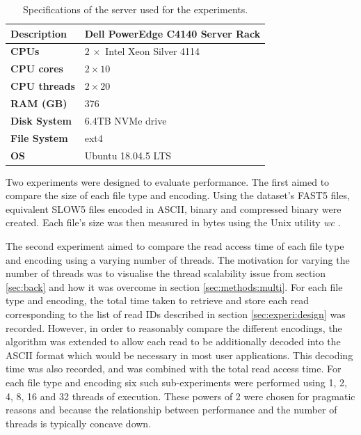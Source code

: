 \begin{table}[h!]
    \caption{Specifications of the server used for the experiments.\label{tab:server}}
    \begin{tabular}{|l|l|}
        \hline
        \textbf{Description} & Dell PowerEdge C4140 Server Rack \\
        \hline
        \textbf{CPUs} & $2\, \times$ Intel Xeon Silver 4114 \\
        \textbf{CPU cores} & $2 \times 10$ \\
        \textbf{CPU threads} & $2 \times 20$ \\
        \hline
        \textbf{RAM\nomenclature{RAM}{Random-access memory} (GB)} & 376 \\
        \textbf{Disk System} & 6.4TB NVMe drive \\
        \textbf{File System} & ext4 \\
        \textbf{OS\nomenclature{OS}{Operating system}} & Ubuntu 18.04.5 LTS\\
        \hline
    \end{tabular}
\end{table}

Two experiments were designed to evaluate performance. The first aimed to compare the size of each file type and encoding. Using the dataset's FAST5 files, equivalent SLOW5 files encoded in ASCII, binary and compressed binary were created. Each file's size was then measured in bytes using the Unix utility \textit{wc} \cite{wc}.

The second experiment aimed to compare the read access time of each file type and encoding using a varying number of threads. The motivation for varying the number of threads was to visualise the thread scalability issue from section \ref{sec:back} and how it was overcome in section \ref{sec:methods:multi}. For each file type and encoding, the total time taken to retrieve and store each read corresponding to the list of read IDs described in section \ref{sec:experi:design} was recorded. However, in order to reasonably compare the different encodings, the algorithm was extended to allow each read to be additionally decoded into the ASCII format which would be necessary in most user applications. This decoding time was also recorded, and was combined with the total read access time. For each file type and encoding six such sub-experiments were performed using 1, 2, 4, 8, 16 and 32 threads of execution. These powers of 2 were chosen for pragmatic reasons and because the relationship between performance and the number of threads is typically concave down.

